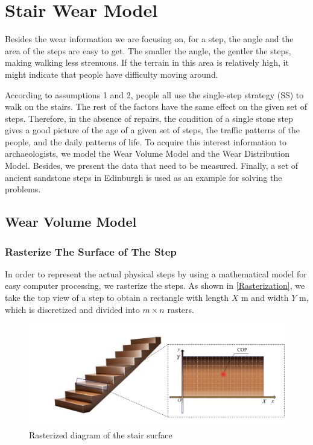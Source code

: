 \documentclass[12pt]{article}  %
\numberwithin{equation}{section} %
\begin{document}
\newpage
\section{Stair Wear Model}
Besides the wear information we are focusing on, for a step, the angle and the area of the steps are easy to get. The smaller the angle, the gentler the steps, making walking less strenuous. If the terrain in this area is relatively high, it might indicate that people have difficulty moving around. 

According to assumptions 1 and 2, people all use the single-step strategy (SS) to walk on the stairs. The rest of the factors have the same effect on the given set of steps. Therefore, in the absence of repairs, the condition of a single stone step gives a good picture of the age of a given set of steps, the traffic patterns of the people, and the daily patterns of life.  To acquire this interest information to archaeologists, we model the  Wear Volume Model and the Wear Distribution Model. Besides, we present the data that need to be measured. Finally, a set of ancient sandstone steps in Edinburgh is used as an example for solving the problems.
\subsection{Wear Volume Model}
\subsubsection{Rasterize The Surface of The Step}
In order to represent the actual physical steps by using a mathematical model for easy computer processing, we rasterize the steps. As shown in \autoref{Rasterization}, we take the top view of a step to obtain a rectangle with length $X$ m and width $Y$ m, which is discretized and divided into $m\times{n}$ rasters.


\begin{figure}[H]
	\centering
	\includegraphics[width=0.9\linewidth]{美赛Latex模板/楼梯坐标1.jpg}
	\caption{Rasterized diagram of the stair surface}
	\label{Rasterization}
     \vspace{-2em} %
\end{figure}
\end{document}
